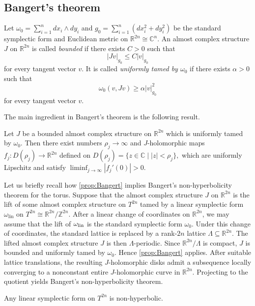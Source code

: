 \documentclass[11pt,twoside]{amsart}
\newcommand{\R}{\mathbb{R}}
\newcommand{\C}{\mathbb{C}}
\begin{document}
\subsection{Bangert's theorem}

Let
\(
\omega_0=\sum_{i=1}^n dx_i\wedge dy_i\) and \(
g_0=\sum_{i=1}^n(dx_i^2+dy_i^2)
\)
be the standard symplectic form and Euclidean metric on
\(\R^{2n}\cong\C^n\).
An almost complex structure \(J\) on \(\R^{2n}\) is called
\emph{bounded} if there exists \(C>0\) such that
\[
|Jv|_{g_0}\leq C|v|_{g_0}
\]
for every tangent vector \(v\). It is called \emph{uniformly tamed by
\(\omega_0\)} if there exists \(\alpha>0\) such that
\[
\omega_0(v,Jv)\geq \alpha |v|_{g_0}^2
\]
for every tangent vector \(v\).


The main ingredient in Bangert's theorem is the following
result.
 
 \begin{proposition}\label{prop:Bangert}
    Let \(J\) be a bounded almost complex structure on \(\R^{2n}\) which is uniformly tamed by \(\omega_0\). Then there exist numbers \(\rho_j\to\infty\) and \(J\)-holomorphic maps
\(
f_j\colon D(\rho_j)\longrightarrow \R^{2n}
\)
defined on 
\(
D(\rho_j)=\{z\in\C\mid |z|<\rho_j\},
\)
which are uniformly Lipschitz and satisfy
\(
\liminf_{j\to\infty}|f_j'(0)|>0.
\)
 \end{proposition}
 

Let us briefly recall how \autoref{prop:Bangert} implies Bangert's non-hyperbolicity theorem for the torus. Suppose that the almost complex structure \(J\) on $\R^{2n}$ is the lift of some almost complex structure on \(T^{2n}\) tamed by a linear symplectic form $\omega_{\mathrm{lin}}$ on $T^{2n}\cong \mathbb{R}^{2n}/\mathbb Z^{2n}$. After a linear change of coordinates on $\mathbb{R}^{2n}$, we may assume that the lift of $\omega_{\rm lin}$ is the standard symplectic form $\omega_0$. Under this change of coordinates, the standard lattice is replaced by a rank-$2n$ lattice $\Lambda \subseteq \mathbb{R}^{2n}$. The lifted almost complex structure $J$ is then $\Lambda$-periodic. Since $\mathbb{R}^{2n}/\Lambda$ is compact, $J$ is bounded and uniformly tamed by $\omega_0$.
Hence \autoref{prop:Bangert} applies. After suitable lattice
translations, the resulting \(J\)-holomorphic disks admit a subsequence locally converging to a nonconstant entire \(J\)-holomorphic curve in \(\R^{2n}\). Projecting to the quotient yields Bangert's non-hyperbolicity theorem.

 \begin{theorem}\label{thm:bangert}
    Any linear symplectic form on $T^{2n}$ is non-hyperbolic.
 \end{theorem}
 
\end{document}
